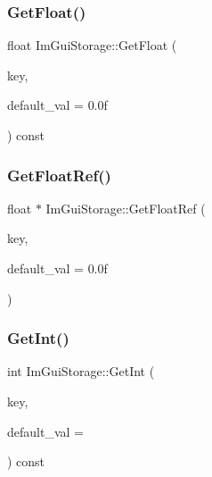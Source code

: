 \mbox{\label{structImGuiStorage_a0f51ef327f7e548d003b0e006967c1eb}} 
\subsubsection{\texorpdfstring{Get\+Float()}{GetFloat()}}
{\footnotesize\ttfamily float Im\+Gui\+Storage\+::\+Get\+Float (\begin{DoxyParamCaption}\item[{Im\+Gui\+ID}]{key,  }\item[{float}]{default\+\_\+val = {\ttfamily 0.0f} }\end{DoxyParamCaption}) const}

\mbox{\label{structImGuiStorage_a4b51cc8c92c65d4224af65a8ce7752ee}} 
\subsubsection{\texorpdfstring{Get\+Float\+Ref()}{GetFloatRef()}}
{\footnotesize\ttfamily float $\ast$ Im\+Gui\+Storage\+::\+Get\+Float\+Ref (\begin{DoxyParamCaption}\item[{Im\+Gui\+ID}]{key,  }\item[{float}]{default\+\_\+val = {\ttfamily 0.0f} }\end{DoxyParamCaption})}

\mbox{\label{structImGuiStorage_ac86b64f5c69a15de6c6c326963eca64a}} 
\subsubsection{\texorpdfstring{Get\+Int()}{GetInt()}}
{\footnotesize\ttfamily int Im\+Gui\+Storage\+::\+Get\+Int (\begin{DoxyParamCaption}\item[{Im\+Gui\+ID}]{key,  }\item[{int}]{default\+\_\+val = {} }\end{DoxyParamCaption}) const}

